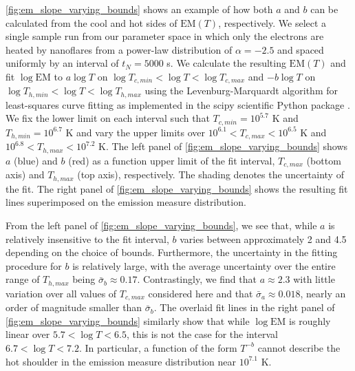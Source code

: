 \documentclass[preprint,linenumbers]{aastex}
\begin{document}
	\par\autoref{fig:em_slope_varying_bounds} shows an example of how both $a$ and $b$ can be calculated from the cool and hot sides of $\mathrm{EM}(T)$, respectively. We select a single sample run from our parameter space in which only the electrons are heated by nanoflares from a power-law distribution of $\alpha=-2.5$ and spaced uniformly by an interval of $t_N=5000$ s. We calculate the resulting $\mathrm{EM}(T)$ and fit $\log{\mathrm{EM}}$ to $a\log{T}$ on $\log{T_{c,min}}<\log{T}<\log{T_{c,max}}$ and $-b\log{T}$ on $\log{T_{h,min}}<\log{T}<\log{T_{h,max}}$ using the Levenburg-Marquardt algorithm for least-squares curve fitting as implemented in the scipy scientific Python package \citep{van_der_walt_numpy_2011}. We fix the lower limit on each interval such that $T_{c,min}=10^{5.7}$ K and $T_{h,min} = 10^{6.7}$  K and vary the upper limits over $10^{6.1}<T_{c,max}<10^{6.5}$ K and $10^{6.8}<T_{h,max}<10^{7.2}$ K. The left panel of \autoref{fig:em_slope_varying_bounds} shows $a$ (blue) and $b$ (red) as a function upper limit of the fit interval, $T_{c,max}$ (bottom axis) and $T_{h,max}$ (top axis), respectively. The shading denotes the uncertainty of the fit. The right panel of \autoref{fig:em_slope_varying_bounds} shows the resulting fit lines superimposed on the emission measure distribution.
	\par From the left panel of \autoref{fig:em_slope_varying_bounds}, we see that, while $a$ is relatively insensitive to the fit interval, $b$ varies between approximately 2 and 4.5 depending on the choice of bounds. Furthermore, the uncertainty in the fitting procedure for $b$ is relatively large, with the average uncertainty over the entire range of $T_{h,max}$ being $\bar{\sigma}_b\approx0.17$. Contrastingly, we find that $a\approx2.3$ with little variation over all values of $T_{c,max}$ considered here and that $\bar{\sigma}_a\approx0.018$, nearly an order of magnitude smaller than $\bar{\sigma}_b$. The overlaid fit lines in the right panel of \autoref{fig:em_slope_varying_bounds} similarly show that while $\log{\mathrm{EM}}$ is roughly linear over $5.7<\log{T}<6.5$, this is not the case for the interval $6.7<\log{T}<7.2$. In particular, a function of the form $T^{-b}$ cannot describe the hot shoulder in the emission measure distribution near $10^{7.1}$ K.
\end{document}
